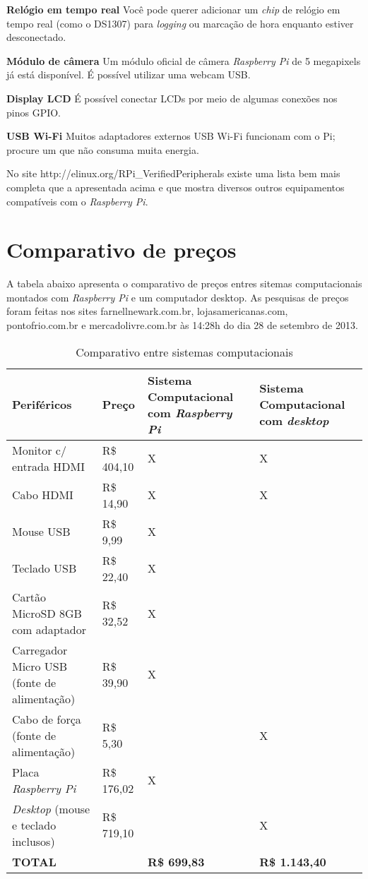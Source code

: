 \textbf{Relógio em tempo real} Você pode querer adicionar um \textit{chip} de relógio em tempo real (como o DS1307) para \textit{logging} ou marcação de hora enquanto estiver desconectado.

\textbf{Módulo de câmera} Um módulo oficial de câmera \textit{Raspberry Pi} de 5 megapixels já está disponível. É possível utilizar uma webcam USB.

\textbf{Display LCD} É possível conectar LCDs por meio de algumas conexões nos pinos GPIO.

\textbf{USB Wi-Fi} Muitos adaptadores externos USB Wi-Fi funcionam com o Pi; procure um que não consuma muita energia. 

No site http://elinux.org/RPi\_VerifiedPeripherals existe uma lista bem mais completa que a apresentada acima e que mostra diversos outros equipamentos compatíveis com o \textit{Raspberry Pi}.

\newpage

\section{Comparativo de preços}

A tabela abaixo apresenta o comparativo de preços entres sitemas computacionais montados com \textit{Raspberry Pi} e um computador desktop. As pesquisas de preços foram feitas nos sites farnellnewark.com.br, lojasamericanas.com, pontofrio.com.br e mercadolivre.com.br às 14:28h do dia 28 de setembro de 2013.

\begin{table}[!htpb]
 \centering
    \begin{tabular}{|p{4cm}|p{2cm}|p{4cm}|p{4cm}|} 
    \hline
        \textbf{Periféricos} & \textbf{Preço} & \textbf{Sistema Computacional com \textit{Raspberry Pi}} & \textbf{Sistema Computacional com \textit{desktop}} \\
    \hline
        Monitor c/ entrada HDMI & R\$ 404,10 & X & X \\
    \hline
        Cabo HDMI & R\$ 14,90 & X & X \\
    \hline
        Mouse USB & R\$ 9,99 & X & \\
    \hline
        Teclado USB & R\$ 22,40 & X & \\
    \hline
        Cartão MicroSD 8GB com adaptador & R\$ 32,52 & X & \\
    \hline
        Carregador Micro USB (fonte de alimentação) & R\$ 39,90 & X & \\
    \hline
        Cabo de força (fonte de alimentação) & R\$ 5,30 & & X \\
    \hline
        Placa \textit{Raspberry Pi} & R\$ 176,02 & X & \\
    \hline
        \textit{Desktop} (mouse e teclado inclusos) & R\$ 719,10 & & X \\
    \hline
        \textbf{TOTAL} & & \textbf{R\$ 699,83} & \textbf{R\$ 1.143,40} \\
    \hline
    \end{tabular}
    \caption{Comparativo entre sistemas computacionais}
    \label{t_fixa}
\end{table}